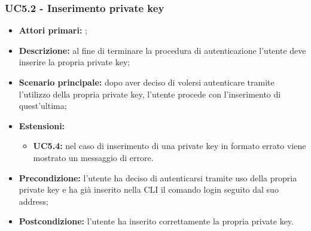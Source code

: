 \subsubsection{UC5.2 - Inserimento private key }
\begin{itemize}
	\item \textbf{Attori primari:} \una{};
	\item \textbf{Descrizione:} al fine di terminare la procedura di autenticazione l’utente deve inserire la propria private key;
	\item \textbf{Scenario principale:} dopo aver deciso di volersi autenticare tramite l’utilizzo della propria private key, l’utente procede con l’inserimento di quest’ultima;  
	\item \textbf{Estensioni:} 
	\begin{itemize}
		\item \textbf{UC5.4:} nel caso di inserimento di una private key in formato errato viene mostrato un messaggio di errore.
	\end{itemize}
	\item \textbf{Precondizione:} l’utente ha deciso di autenticarsi tramite uso della propria private key e ha già inserito nella CLI il comando login seguito dal suo address; 
	\item \textbf{Postcondizione:} l’utente ha inserito correttamente la propria private key. 
\end{itemize}